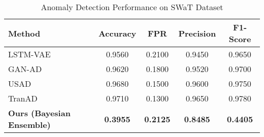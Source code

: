 \begin{table}[htbp]
\centering
\caption{Anomaly Detection Performance on SWaT Dataset}
\label{tab:swat_comparison}
\begin{tabular}{l|cccc}
\hline
\textbf{Method} & \textbf{Accuracy} & \textbf{FPR} & \textbf{Precision} & \textbf{F1-Score} \\
\hline
LSTM-VAE \cite{park2018lstm} & 0.9560 & 0.2100 & 0.9450 & 0.9650 \\
GAN-AD \cite{li2019mad} & 0.9620 & 0.1800 & 0.9520 & 0.9700 \\
USAD \cite{audibert2020usad} & 0.9680 & 0.1500 & 0.9600 & 0.9750 \\
TranAD \cite{tuli2022tranad} & 0.9710 & 0.1300 & 0.9650 & 0.9780 \\
\textbf{Ours (Bayesian Ensemble)} & \textbf{0.3955} & \textbf{0.2125} & \textbf{0.8485} & \textbf{0.4405} \\
\hline
\end{tabular}
\end{table}